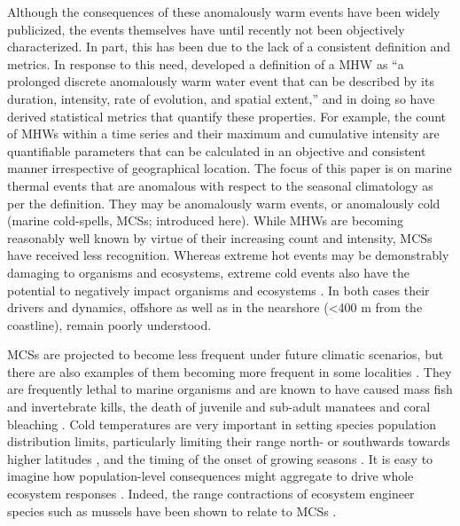 \documentclass[a4paper,10pt,review]{elsarticle}
\begin{document}
Although the consequences of these anomalously warm events have been widely publicized, the events themselves have until recently not been objectively characterized. In part, this has been due to the lack of a consistent definition and metrics. In response to this need, \citet{Hobday2016} developed a definition of a MHW as ``a prolonged discrete anomalously warm water event that can be described by its duration, intensity, rate of evolution, and spatial extent,'' and in doing so have derived statistical metrics that quantify these properties. For example, the count of MHWs within a time series and their maximum and cumulative intensity are quantifiable parameters that can be calculated in an objective and consistent manner irrespective of geographical location. The focus of this paper is on marine thermal events that are anomalous with respect to the seasonal climatology as per the \citet{Hobday2016} definition. They may be anomalously warm events, or anomalously cold (marine cold-spells, MCSs; introduced here). While MHWs are becoming reasonably well known by virtue of their increasing count and intensity, MCSs have received less recognition. Whereas extreme hot events may be demonstrably damaging to organisms and ecosystems, extreme cold events also have the potential to negatively impact organisms and ecosystems \citep{Lirman2011}. In both cases their drivers and dynamics, offshore as well as in the nearshore (<400 m from the coastline), remain poorly understood.

MCSs are projected to become less frequent under future climatic scenarios, but there are also examples of them becoming more frequent in some localities \citep[e.g.][]{Gershunov2008, Matthes2015}. They are frequently lethal to marine organisms \citep{Woodward1987} and are known to have caused mass fish \citep{Gunter1941, Gunter1951, Holt1983} and invertebrate \citep{Gunter1951, Crisp1964} kills, the death of juvenile and sub-adult manatees \citep{OShea1985, Marsh1986} and coral bleaching \citep{Lirman2011}. Cold temperatures are very important in setting species population distribution limits, particularly limiting their range north- or southwards towards higher latitudes \citep{Firth2011}, and the timing of the onset of growing seasons \citep{Jentsch2007}. It is easy to imagine how population-level consequences might aggregate to drive whole ecosystem responses \citep[e.g.][]{Kreyling2008, Rehage2016}. Indeed, the range contractions of ecosystem engineer species such as mussels have been shown to relate to MCSs \citep{Firth2011, Firth2015}.
\end{document}
